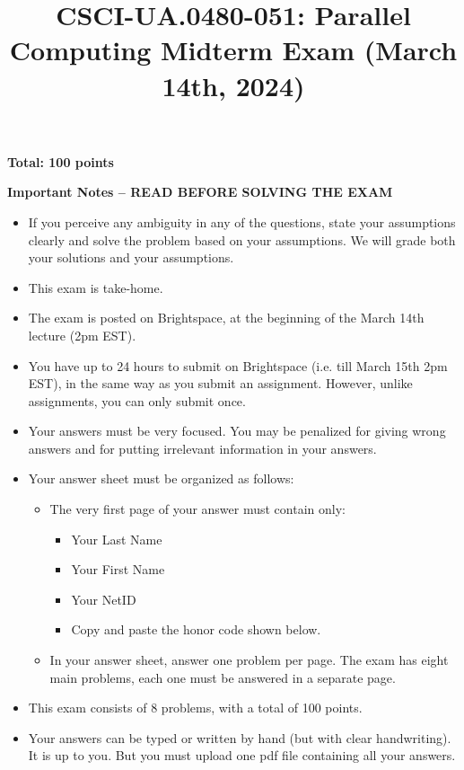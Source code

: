 \documentclass{article}
\title{CSCI-UA.0480-051: Parallel Computing Midterm Exam (March 14th, 2024)}
\author{}
\date{}
\begin{document}
\maketitle

\textbf{Total: 100 points}

\textbf{Important Notes -- READ BEFORE SOLVING THE EXAM}

\begin{itemize}
    \item If you perceive any ambiguity in any of the questions, state your assumptions clearly and solve the problem based on your assumptions. We will grade both your solutions and your assumptions.
    \item This exam is take-home.
    \item The exam is posted on Brightspace, at the beginning of the March 14th lecture (2pm EST).
    \item You have up to 24 hours to submit on Brightspace (i.e. till March 15th 2pm EST), in the same way as you submit an assignment. However, unlike assignments, you can only submit once.
    \item Your answers must be very focused. You may be penalized for giving wrong answers and for putting irrelevant information in your answers.
    \item Your answer sheet must be organized as follows:
    \begin{itemize}
        \item The very first page of your answer must contain only:
        \begin{itemize}
            \item Your Last Name
            \item Your First Name
            \item Your NetID
            \item Copy and paste the honor code shown below.
        \end{itemize}
        \item In your answer sheet, answer one problem per page. The exam has eight main problems, each one must be answered in a separate page.
    \end{itemize}
    \item This exam consists of 8 problems, with a total of 100 points.
    \item Your answers can be typed or written by hand (but with clear handwriting). It is up to you. But you must upload one pdf file containing all your answers.
\end{itemize}
\end{document}
